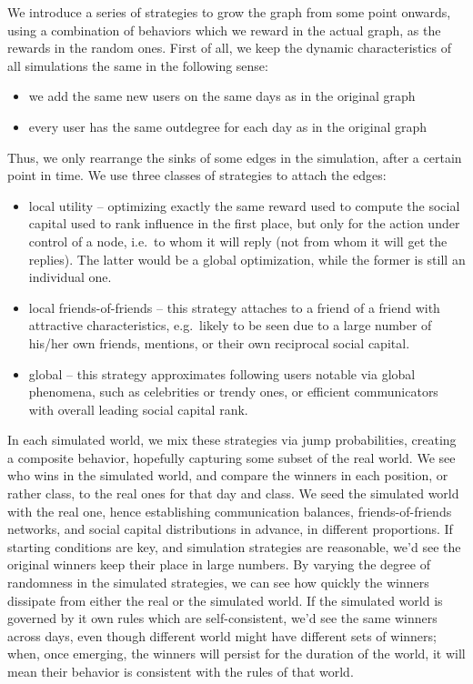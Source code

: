 \documentclass[10pt,oneside]{memoir}
\begin{document}
We introduce a series of strategies to grow the graph from some point onwards, using a combination of behaviors which we reward in the actual graph, as the rewards in the random ones.  First of all, we keep the dynamic characteristics of all simulations the same in the following sense:


\begin{itemize}


\item we add the same new users on the same days as in the original graph

\item every user has the same outdegree for each day as in the original graph
\end{itemize}

Thus, we only rearrange the sinks of some edges in the simulation, after a certain point in time.  We use three classes of strategies to attach the edges:


\begin{itemize}


\item local utility -- optimizing exactly the same reward used to compute the social capital used to rank influence in the first place, but only for the action under control of a node, i.e.\ to whom it will reply (not from whom it will get the replies).  The latter would be a global optimization, while the former is still an individual one.

\item local friends-of-friends -- this strategy attaches to a friend of a friend with attractive characteristics, e.g.\ likely to be seen due to a large number of his/her own friends, mentions, or their own reciprocal social capital.

\item global -- this strategy approximates following users notable via global phenomena, such as celebrities or trendy ones, or efficient communicators with overall leading social capital rank.
\end{itemize}

In each simulated world, we mix these strategies via jump probabilities, creating a composite behavior, hopefully capturing some subset of the real world.  We see who wins in the simulated world, and compare the winners in each position, or rather class, to the real ones for that day and class.  We seed the simulated world with the real one, hence establishing communication balances, friends-of-friends networks, and social capital distributions in advance, in different proportions.  If starting conditions are key, and simulation strategies are reasonable, we'd see the original winners keep their place in large numbers.  By varying the degree of randomness in the simulated strategies, we can see how quickly the winners dissipate from either the real or the simulated world.  If the simulated world is governed by it own rules which are self-consistent, we'd see the same winners across days, even though different world might have different sets of winners; when, once emerging, the winners will persist for the duration of the world, it will mean their behavior is consistent with the rules of that world.
\end{document}
